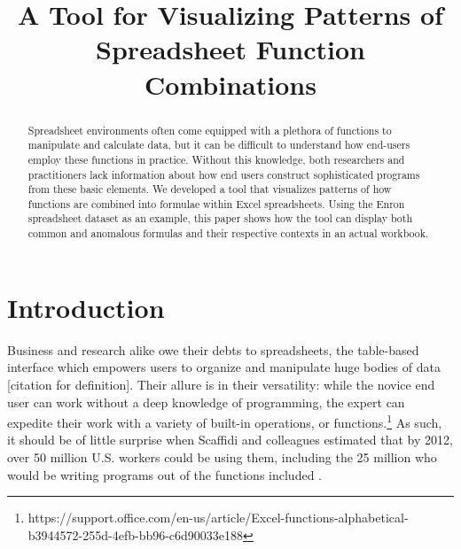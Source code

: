 \documentclass[conference]{IEEEtran}
\begin{document}
\title{A Tool for Visualizing Patterns of Spreadsheet Function Combinations}


\author{
}






\maketitle

\begin{abstract}
Spreadsheet environments often come equipped with a plethora of functions to manipulate and calculate data, but it can be difficult to understand how end-users employ these functions in practice. Without this knowledge, both researchers and practitioners lack information about how end users construct sophisticated programs from these basic elements. We developed a tool that visualizes patterns of how functions are combined into formulae within Excel spreadsheets. Using the Enron spreadsheet dataset as an example, this paper shows how the tool can display both common and anomalous formulas and their respective contexts in an actual workbook.
\end{abstract}





%
\IEEEpeerreviewmaketitle



\section{Introduction}
Business and research alike owe their debts to spreadsheets, the table-based interface which empowers users to organize and manipulate huge bodies of data [citation for definition]. Their allure is in their versatility: while the novice end user can work without a deep knowledge of programming, the expert can expedite their work with a variety of built-in operations, or functions.\footnote{https://support.office.com/en-us/article/Excel-functions-alphabetical-b3944572-255d-4efb-bb96-c6d90033e188} As such, it should be of little surprise when Scaffidi and colleagues estimated that by 2012, over 50 million U.S. workers could be using them, including the 25 million who would be writing programs out of the functions included \cite{scaffidi2005estimating}.\par
\end{document}
